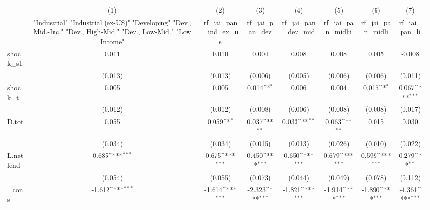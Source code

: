 {
\def\sym#1{\ifmmode^{#1}\else\(^{#1}\)\fi}
\begin{tabular}{l*{7}{c}}
\toprule
            &\multicolumn{1}{c}{(1)}&\multicolumn{1}{c}{(2)}&\multicolumn{1}{c}{(3)}&\multicolumn{1}{c}{(4)}&\multicolumn{1}{c}{(5)}&\multicolumn{1}{c}{(6)}&\multicolumn{1}{c}{(7)}\\
            &\multicolumn{1}{c}{ "Industrial" "Industrial (ex-US)" "Developing" "Dev., Mid.-Inc." "Dev., High-Mid."  "Dev., Low-Mid." "Low Income" }&\multicolumn{1}{c}{rf\_jai\_pan\_ind\_ex\_us}&\multicolumn{1}{c}{rf\_jai\_pan\_dev}&\multicolumn{1}{c}{rf\_jai\_pan\_dev\_mid}&\multicolumn{1}{c}{rf\_jai\_pan\_midhi}&\multicolumn{1}{c}{rf\_jai\_pan\_midli}&\multicolumn{1}{c}{rf\_jai\_pan\_li}\\
\midrule
shock\_s1    &       0.011         &       0.010         &       0.004         &       0.008         &       0.008         &       0.005         &      -0.008         \\
            &     (0.013)         &     (0.013)         &     (0.006)         &     (0.005)         &     (0.006)         &     (0.006)         &     (0.011)         \\
\addlinespace
shock\_t     &       0.005         &       0.005         &       0.014\sym{*}  &       0.006         &       0.004         &       0.016\sym{*}  &       0.067\sym{***}\\
            &     (0.012)         &     (0.012)         &     (0.008)         &     (0.006)         &     (0.008)         &     (0.008)         &     (0.017)         \\
\addlinespace
D.tot       &       0.055         &       0.059\sym{*}  &       0.037\sym{**} &       0.033\sym{**} &       0.063\sym{**} &       0.015         &       0.030         \\
            &     (0.034)         &     (0.034)         &     (0.015)         &     (0.013)         &     (0.026)         &     (0.010)         &     (0.022)         \\
\addlinespace
L.netlend   &       0.685\sym{***}&       0.675\sym{***}&       0.450\sym{***}&       0.650\sym{***}&       0.679\sym{***}&       0.599\sym{***}&       0.279\sym{**} \\
            &     (0.054)         &     (0.055)         &     (0.073)         &     (0.044)         &     (0.049)         &     (0.078)         &     (0.112)         \\
\addlinespace
\_cons      &      -1.612\sym{***}&      -1.614\sym{***}&      -2.323\sym{***}&      -1.821\sym{***}&      -1.914\sym{***}&      -1.890\sym{***}&      -4.361\sym{***}\\

\end{tabular}}
